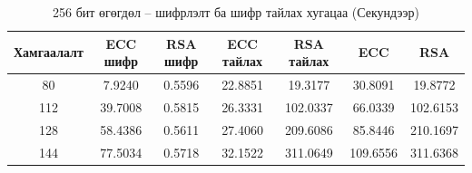 	\begin{table}
	\centering
	\caption{256 бит өгөгдөл – шифрлэлт ба шифр тайлах хугацаа (Секундээр) \cite{RSAvsECC}}
	\begin{tabular}{|c|c|c|c|c|c|c|}
	\hline
	Хамгаалалт & ECC шифр & RSA шифр & ECC тайлах & RSA тайлах & ECC  & RSA  \\
	\hline
	80 & 7.9240 & 0.5596 & 22.8851 & 19.3177 & 30.8091 & 19.8772 \\
	112 & 39.7008 & 0.5815 & 26.3331 & 102.0337 & 66.0339 & 102.6153 \\
	128 & 58.4386 & 0.5611 & 27.4060 & 209.6086 & 85.8446 & 210.1697 \\
	144 & 77.5034 & 0.5718 & 32.1522 & 311.0649 & 109.6556 & 311.6368 \\
	\hline
	\end{tabular}
	\end{table}
	